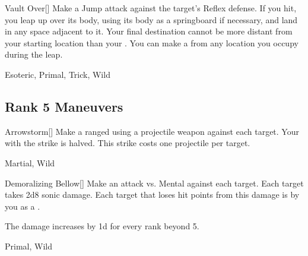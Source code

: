 \lowercase{\hypertarget{maneuver:Vault Over}{}}\label{maneuver:Vault Over}
\hypertarget{maneuver:Vault Over}{}
\begin{freeability}[Rank 4]{Vault Over}[]
Make a Jump attack against the target's Reflex defense.
If you hit, you leap up over its body, using its body as a springboard if necessary, and land in any space adjacent to it.
Your final destination cannot be more distant from your starting location than your .
You can make a  from any location you occupy during the leap.


 Esoteric, Primal, Trick, Wild
\end{freeability}
\vspace{0.25em}


\subsection{Rank 5 Maneuvers}

\lowercase{\hypertarget{maneuver:Arrowstorm}{}}\label{maneuver:Arrowstorm}
\hypertarget{maneuver:Arrowstorm}{}
\begin{freeability}[Rank 5]{Arrowstorm}[]
Make a ranged  using a projectile weapon against each target.
Your  with the strike is halved.
This strike costs one projectile per target.


 Martial, Wild
\end{freeability}
\vspace{0.25em}



\lowercase{\hypertarget{maneuver:Demoralizing Bellow}{}}\label{maneuver:Demoralizing Bellow}
\hypertarget{maneuver:Demoralizing Bellow}{}
\begin{freeability}[Rank 5]{Demoralizing Bellow}[]
Make an attack vs. Mental against each target.
\hit Each target takes 2d8 sonic damage.
Each target that loses hit points from this damage is  by you as a .

\rankline
The damage increases by \plus1d for every rank beyond 5.


 Primal, Wild
\end{freeability}
\vspace{0.25em}



